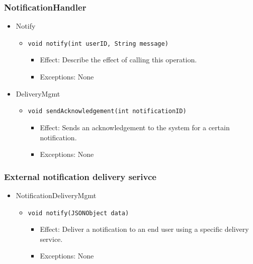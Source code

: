     \subsubsection{NotificationHandler}
    \begin{itemize}
        \item Notify
        \begin{itemize}
            \item \texttt{void notify(int userID, String message)}
            \begin{itemize}
                \item Effect: Describe the effect of calling this operation.
                \item Exceptions: None
            \end{itemize}
        \end{itemize}
        \item DeliveryMgmt
        \begin{itemize}
            \item \texttt{void sendAcknowledgement(int notificationID)}
            \begin{itemize}
                \item Effect: Sends an acknowledgement to the system for a certain notification.
                \item Exceptions: None
            \end{itemize}
        \end{itemize}
    \end{itemize}

    \subsubsection{External notification delivery serivce}
    \begin{itemize}
        \item NotificationDeliveryMgmt
        \begin{itemize}
            \item \texttt{void notify(JSONObject data)}
            \begin{itemize}
                \item Effect: Deliver a notification to an end user using a specific delivery service.
                \item Exceptions: None
            \end{itemize}
        \end{itemize}
    \end{itemize}


